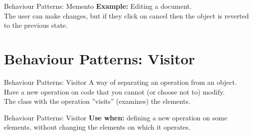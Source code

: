 \documentclass[14pt,aspectratio=169]{beamer}
\begin{document}
\begin{frame}{Behaviour Patterns: Memento}
\textbf{Example:} Editing a document. \\
\vspace{1em}
The user can make changes, but if they click on cancel then the object is reverted to the previous state. 
\end{frame}



\section*{Behaviour Patterns: Visitor}



\begin{frame}{Behaviour Patterns: Visitor}
A way of separating an operation from an object. \\
\vspace{1em}
Have a new operation on code that you cannot (or choose not to) modify. \\
\vspace{1em}
The class with the operation ''visits'' (examines) the elements.
\end{frame}



\begin{frame}{Behaviour Patterns: Visitor}
\large
\textbf{Use when:} defining a new operation on some elements, without changing the elements on which it operates.
\end{frame}
\end{document}
